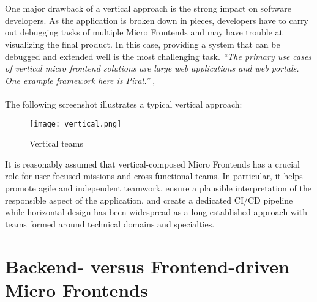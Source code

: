 \documentclass[a4paper]{book}
\begin{document}
\\
\\
One major drawback of a vertical approach is the strong impact on software developers. As the application is broken down in pieces, developers have to carry out debugging tasks of multiple Micro Frontends and may have trouble at visualizing the final product. In this case, providing a system that can be debugged and extended well is the most challenging task. \textit{“The primary use cases of vertical micro frontend solutions are large web applications and web portals. One example framework here is Piral.”} \cite{Rap20}, \cite{Piral}
\\
\\
The following screenshot illustrates a typical vertical approach:

\begin{figure}[h!]
    \centering
    \captionsetup{justification=centering}
    \texttt{[image: vertical.png]}
    \caption{Vertical teams \cite{Gee20}}
    \label{fig:2}
\end{figure}

It is reasonably assumed that vertical-composed Micro Frontends has a crucial role for user-focused missions and cross-functional teams. In particular, it helps promote agile and independent teamwork, ensure a plausible interpretation of the responsible aspect of the application, and create a dedicated CI/CD pipeline while horizontal design has been widespread as a long-established approach with teams formed around technical domains and specialties.

\section{Backend- versus Frontend-driven Micro Frontends}
\end{document}
